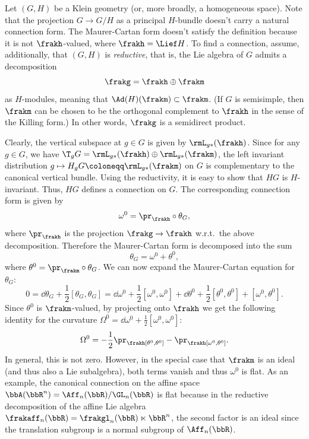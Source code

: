 \begin{example}\label{ex 1.3.19 RS2}
    Let $(G,H)$ be a Klein geometry (or, more broadly, a homogeneous space). Note that the projection $G\to G\slash H$ as a principal $H$-bundle doesn't carry a natural connection form. The Maurer-Cartan form doesn't satisfy the definition because it is not $\frakh$-valued, where $\frakh=\Lief H$. To find a connection, assume, additionally, that $(G,H)$ is \emph{reductive}, that is, the Lie algebra of $G$ admits a decomposition
    \[\frakg=\frakh\oplus\frakm\]
    as $H$-modules, meaning that $\Ad(H)(\frakm)\subset \frakm$. (If $G$ is semisimple, then $\frakm$ can be chosen to be the orthogonal complement to $\frakh$ in the sense of the Killing form.) In other words, $\frakg$ is a semidirect product.

    Clearly, the vertical subspace at $g\in G$ is given by $\rmL_{g\ast}(\frakh)$. Since for any $g\in G$, we have $\T_gG=\rmL_{g\ast}(\frakh)\oplus \rmL_{g\ast}(\frakm)$, the left invariant distribution $g\mapsto H_gG\coloneqq \rmL_{g\ast}(\frakm)$ on $G$ is complementary to the canonical vertical bundle. Using the reductivity, it is easy to show that $HG$ is $H$-invariant. Thus, $HG$ defines a connection on $G$. The corresponding connection form is given by
    \[\omega^0=\pr_\frakh\circ \theta_G,\]
    where $\pr_\frakh$ is the projection $\frakg\to \frakh$ w.r.t.\ the above decomposition. Therefore the Maurer-Cartan form is decomposed into the sum
    \[\theta_G=\omega^0+\theta^0,\]
    where $\theta^0=\pr_{\frakm}\circ\theta_G$. We can now expand the Maurer-Cartan equation for $\theta_G$:
    \[0=\dd \theta_G+\frac12[\theta_G,\theta_G]=\dd \omega^0+\frac12[\omega^0,\omega^0]+\dd \theta^0+\frac12[\theta^0,\theta^0]+[\omega^0,\theta^0].\]
    Since $\theta^0$ is $\frakm$-valued, by projecting onto $\frakh$ we get the following identity for the curvature $\Omega^0=\dd\omega^0+\frac12[\omega^0,\omega^0]$:
    \[\Omega^0=-\frac12\pr_\frakh[\theta^0,\theta^0]-\pr_\frakh[\omega^0,\theta^0].\]
    In general, this is not zero. However, in the special case that $\frakm$ is an ideal (and thus also a Lie subalgebra), both terms vanish and thus $\omega^0$ is flat. As an example, the canonical connection on the affine space $\bbA(\bbR^n)=\Aff_n(\bbR)\slash \GL_n(\bbR)$ is flat because in the reductive decomposition of the affine Lie algebra $\frakaff_n(\bbR)=\frakgl_n(\bbR)\ltimes \bbR^n$, the second factor is an ideal since the translation subgroup is a normal subgroup of $\Aff_n(\bbR)$.
\end{example}

